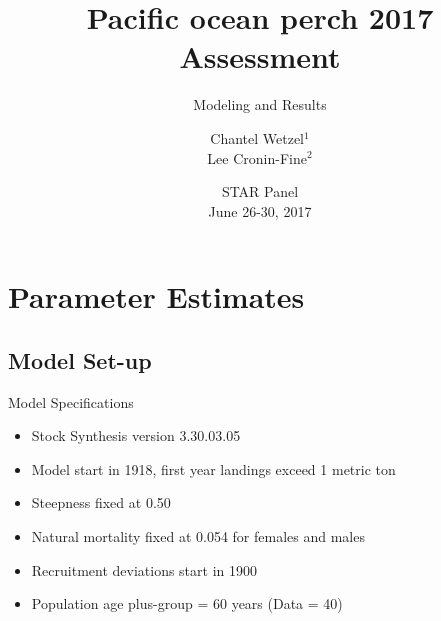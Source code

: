 \documentclass[pdf]{beamer}\usepackage[]{graphicx}\usepackage[]{color}
\title{Pacific ocean perch 2017 Assessment}
\subtitle{Modeling and Results}
\author{Chantel Wetzel$^{1}$\\
        Lee Cronin-Fine$^{2}$}
\institute[NWFSC]{
Northwest Fisheries Science Center$^1$ \\
University of Washington$^2$ \\
\medskip
}
\date{{\footnotesize STAR Panel \\ June 26-30, 2017}}
\begin{document}
\begin{frame}
  \titlepage
\end{frame}


\section{Parameter Estimates}
\subsection{Model Set-up}
\begin{frame}{Model Specifications}
  \begin{itemize}
    \item Stock Synthesis version 3.30.03.05
    \item Model start in 1918, first year landings exceed 1 metric ton
    \item Steepness fixed at 0.50
    \item Natural mortality fixed at 0.054 for females and males
    \item Recruitment deviations start in 1900
    \item Population age plus-group = 60 years (Data = 40)
  \end{itemize}
\end{frame}
  
\end{document}
